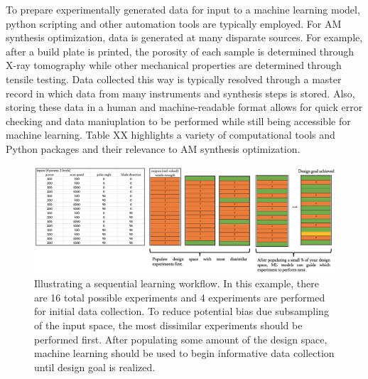 To prepare experimentally generated data for input to a machine learning model, python scripting and other automation tools are typically employed.
For AM synthesis optimization, data is generated at many disparate sources.
For example, after a build plate is printed, the porosity of each sample is determined through X-ray tomography while other mechanical properties are determined through tensile testing.
Data collected this way is typically resolved through a master record in which data from many instruments and synthesis steps is stored.
Also, storing these data in a human and machine-readable format allows for quick error checking and data maniuplation to be performed while still being accessible for machine learning.
Table XX highlights a variety of computational tools and Python packages and their relevance to AM synthesis optimization.


\begin{figure}
  \includegraphics[width=0.9\linewidth]{SectionII/design_example.png}
  \caption{Illustrating a sequential learning workflow. In this example, there are 16 total possible experiments and
   4 experiments are performed for initial data collection. To reduce potential bias due subsampling of the input space,
  the most dissimilar experiments should be performed first. After populating some amount of the design space,
  machine learning should be used to begin informative data collection until design goal is realized.}
  \label{fig:SL}
\end{figure}

